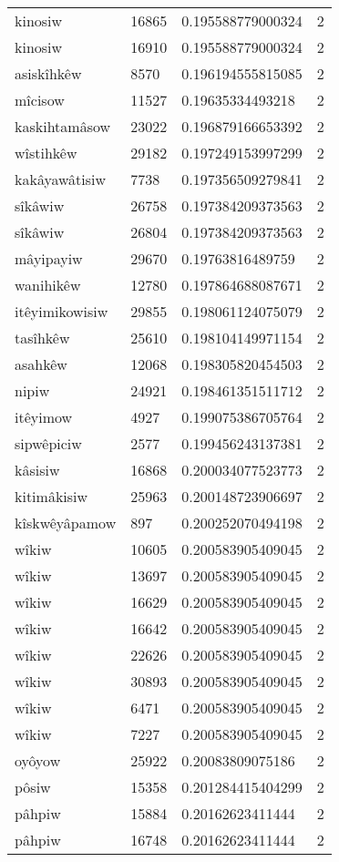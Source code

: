 \begin{longtable}{llll}
kinosiw & 16865 & 0.195588779000324 & 2 \\
kinosiw & 16910 & 0.195588779000324 & 2 \\
asiskîhkêw & 8570 & 0.196194555815085 & 2 \\
mîcisow & 11527 & 0.19635334493218 & 2 \\
kaskihtamâsow & 23022 & 0.196879166653392 & 2 \\
wîstihkêw & 29182 & 0.197249153997299 & 2 \\
kakâyawâtisiw & 7738 & 0.197356509279841 & 2 \\
sîkâwiw & 26758 & 0.197384209373563 & 2 \\
sîkâwiw & 26804 & 0.197384209373563 & 2 \\
mâyipayiw & 29670 & 0.19763816489759 & 2 \\
wanihikêw & 12780 & 0.197864688087671 & 2 \\
itêyimikowisiw & 29855 & 0.198061124075079 & 2 \\
tasîhkêw & 25610 & 0.198104149971154 & 2 \\
asahkêw & 12068 & 0.198305820454503 & 2 \\
nipiw & 24921 & 0.198461351511712 & 2 \\
itêyimow & 4927 & 0.199075386705764 & 2 \\
sipwêpiciw & 2577 & 0.199456243137381 & 2 \\
kâsisiw & 16868 & 0.200034077523773 & 2 \\
kitimâkisiw & 25963 & 0.200148723906697 & 2 \\
kîskwêyâpamow & 897 & 0.200252070494198 & 2 \\
wîkiw & 10605 & 0.200583905409045 & 2 \\
wîkiw & 13697 & 0.200583905409045 & 2 \\
wîkiw & 16629 & 0.200583905409045 & 2 \\
wîkiw & 16642 & 0.200583905409045 & 2 \\
wîkiw & 22626 & 0.200583905409045 & 2 \\
wîkiw & 30893 & 0.200583905409045 & 2 \\
wîkiw & 6471 & 0.200583905409045 & 2 \\
wîkiw & 7227 & 0.200583905409045 & 2 \\
oyôyow & 25922 & 0.20083809075186 & 2 \\
pôsiw & 15358 & 0.201284415404299 & 2 \\
pâhpiw & 15884 & 0.20162623411444 & 2 \\
pâhpiw & 16748 & 0.20162623411444 & 2 \\

\end{longtable}
